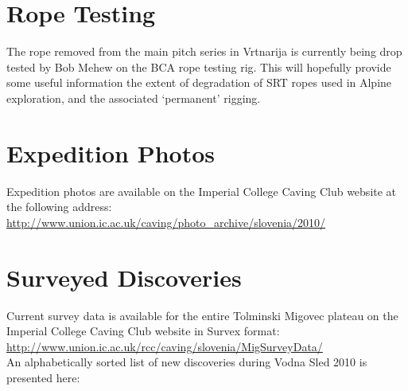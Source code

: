 \section{Rope Testing}

The rope removed from the main pitch series in Vrtnarija is currently being
drop tested by Bob Mehew on the BCA rope testing rig. This will hopefully
provide some useful information the extent of degradation of SRT ropes used in
Alpine exploration, and the associated `permanent' rigging.

\section{Expedition Photos}

Expedition photos are available on the Imperial College Caving Club website at the following address:\\

\url{http://www.union.ic.ac.uk/caving/photo\_archive/slovenia/2010/}

\section{Surveyed Discoveries}

Current survey data is available for the entire Tolminski Migovec plateau on the Imperial College Caving Club website in Survex format:\\

\url{http://www.union.ic.ac.uk/rcc/caving/slovenia/MigSurveyData/}
\\
An alphabetically sorted list of new discoveries during Vodna Sled 2010 is presented here:\\

